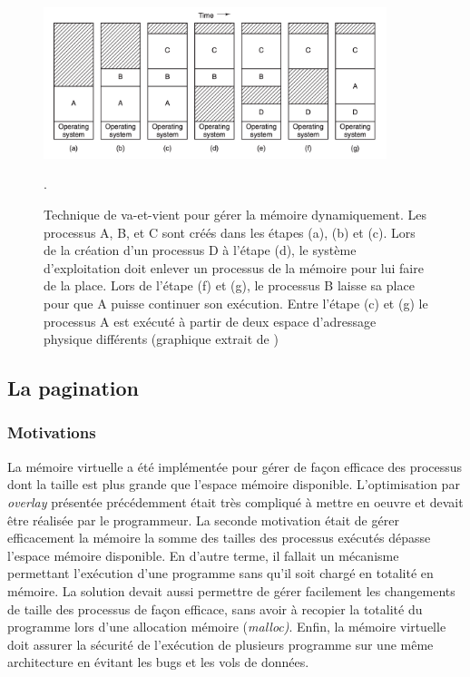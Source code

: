 \begin{figure}
    \center
    \includegraphics[width=10cm]{images/memory_swapping.png}
    \caption{\label{pic:memory_swapping} Technique de va-et-vient pour gérer la mémoire dynamiquement. Les processus A, B, et C sont créés dans les étapes (a), (b) et (c). Lors de la création d'un processus D à l'étape (d), le système d'exploitation doit enlever un processus de la mémoire pour lui faire de la place. Lors de l'étape (f) et (g), le processus B laisse sa place pour que A puisse continuer son exécution. Entre l'étape (c) et (g) le processus A est exécuté à partir de deux espace d'adressage physique différents (graphique extrait de \cite{tanenbaum2008systeme})}.
\end{figure}





\subsection{La pagination}


\subsubsection{Motivations}
La mémoire virtuelle a été implémentée pour gérer de façon efficace des processus dont la taille est plus grande que l'espace mémoire disponible. L'optimisation par \textit{overlay} présentée précédemment était très compliqué à mettre en oeuvre et devait être réalisée par le programmeur. La seconde motivation était de gérer efficacement la mémoire la somme des tailles des processus exécutés dépasse l'espace mémoire disponible. En d'autre terme, il fallait un mécanisme permettant l'exécution d'une programme sans qu'il soit chargé en totalité en mémoire. La solution devait aussi permettre de gérer facilement les changements de taille des processus de façon efficace, sans avoir à recopier la totalité du programme lors d'une allocation mémoire (\textit{malloc)}. Enfin, la mémoire virtuelle doit assurer la sécurité de l'exécution de plusieurs programme sur une même architecture en évitant les bugs et les vols de données.


